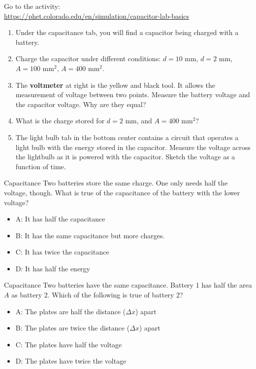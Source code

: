 \documentclass{beamer}
\begin{document}
\begin{frame}
\small
Go to the activity: \\ \vspace{0.5cm}
\url{https://phet.colorado.edu/en/simulation/capacitor-lab-basics}
\begin{enumerate}
\item Under the capacitance tab, you will find a capacitor being charged with a battery.
\item Charge the capacitor under different conditions: $d=10$ mm, $d=2$ mm, $A=100$ mm$^2$, $A=400$ mm$^2$.
\item The \textbf{voltmeter} at right is the yellow and black tool.  It allows the measurement of voltage between two points.  Measure the battery voltage and the capacitor voltage.  Why are they equal?
\item What is the charge stored for $d=2$ mm, and $A=400$ mm$^2$?
\item The light bulb tab in the bottom center contains a circuit that operates a light bulb with the energy stored in the capacitor.  Measure the voltage across the lightbulb as it is powered with the capacitor.  Sketch the voltage as a function of time.
\end{enumerate}
\end{frame}

\begin{frame}{Capacitance}
Two batteries store the same charge.  One only needs half the voltage, though.  What is true of the capacitance of the battery with the lower voltage?
\begin{itemize}
\item A: It has half the capacitance
\item B: It has the same capacitance but more charges.
\item C: It has twice the capacitance
\item D: It has half the energy
\end{itemize}
\end{frame}

\begin{frame}{Capacitance}
Two batteries have the same capacitance.  Battery 1 has half the area $A$ as battery 2.  Which of the following is true of battery 2?
\begin{itemize}
\item A: The plates are half the distance ($\Delta x$) apart
\item B: The plates are twice the distance ($\Delta x$) apart
\item C: The plates have half the voltage
\item D: The plates have twice the voltage
\end{itemize}
\end{frame}
\end{document}
